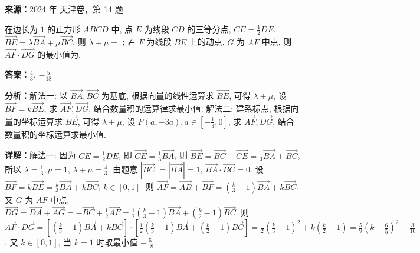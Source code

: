 \begin{question}[points=5]
\textbf{来源：}2024 年 天津卷，第 14 题\par
在边长为 $1$ 的正方形 $ABCD$ 中, 点 $E$ 为线段 $CD$ 的三等分点, $CE = \frac{1}{2}DE$, $\overrightarrow{BE} = \lambda \overrightarrow{BA} + \mu \overrightarrow{BC}$, 则 $\lambda+\mu =$ ; 若 $F$ 为线段 $BE$ 上的动点, $G$ 为 $AF$ 中点, 则 $\overrightarrow{AF} \cdot \overrightarrow{DG}$ 的最小值为.
\begin{solution}
\textbf{答案：}$\frac{4}{3}$, $-\frac{5}{18}$

\textbf{分析：}解法一: 以 $\overrightarrow{BA},\overrightarrow{BC}$ 为基底, 根据向量的线性运算求 $\overrightarrow{BE}$, 可得 $\lambda+\mu$, 设 $\overrightarrow{BF}=k\overrightarrow{BE}$, 求 $\overrightarrow{AF},\overrightarrow{DG}$, 结合数量积的运算律求最小值. 解法二: 建系标点, 根据向量的坐标运算求 $\overrightarrow{BE}$, 可得 $\lambda+\mu$, 设 $F(a,-3a),a\in[-\frac{1}{3},0]$, 求 $\overrightarrow{AF},\overrightarrow{DG}$, 结合数量积的坐标运算求最小值.

\textbf{详解：}解法一: 因为 $CE=\frac{1}{2}DE$, 即 $\overrightarrow{CE}=\frac{1}{3}\overrightarrow{BA}$, 则 $\overrightarrow{BE}=\overrightarrow{BC}+\overrightarrow{CE}=\frac{1}{3}\overrightarrow{BA}+\overrightarrow{BC}$, 所以 $\lambda=\frac{1}{3},\mu=1$, $\lambda+\mu=\frac{4}{3}$. 由题意 $|\overrightarrow{BC}|=|\overrightarrow{BA}|=1$, $\overrightarrow{BA}\cdot\overrightarrow{BC}=0$. 设 $\overrightarrow{BF}=k\overrightarrow{BE}= \frac{k}{3}\overrightarrow{BA}+k\overrightarrow{BC}$, $k\in[0,1]$. 则 $\overrightarrow{AF}=\overrightarrow{AB}+\overrightarrow{BF}=(\frac{k}{3}-1)\overrightarrow{BA}+k\overrightarrow{BC}$. 又 $G$ 为 $AF$ 中点, $\overrightarrow{DG}=\overrightarrow{DA}+\overrightarrow{AG}=-\overrightarrow{BC}+\frac{1}{2}\overrightarrow{AF}=\frac{1}{2}(\frac{k}{3}-1)\overrightarrow{BA}+(\frac{k}{2}-1)\overrightarrow{BC}$. 则 $\overrightarrow{AF}\cdot\overrightarrow{DG}=[ (\frac{k}{3}-1)\overrightarrow{BA}+k\overrightarrow{BC} ]\cdot[\frac{1}{2}(\frac{k}{3}-1)\overrightarrow{BA}+(\frac{k}{2}-1)\overrightarrow{BC}] =\frac{1}{2}(\frac{k}{3}-1)^2 + k(\frac{k}{2}-1)=\frac{5}{9}(k-\frac{6}{5})^2-\frac{3}{10}$, 又 $k\in[0,1]$, 当 $k=1$ 时取最小值 $-\frac{5}{18}$.
\end{solution}
\end{question}

